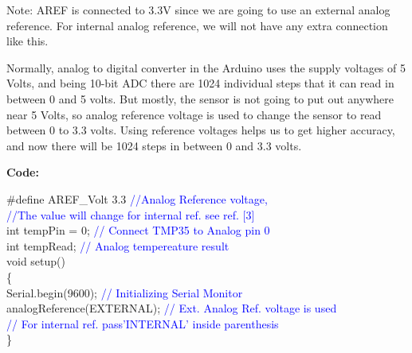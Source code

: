 \documentclass[12pt,a4paper]{article}
\begin{document}
\begin{justify}
\noindent Note: AREF is connected to 3.3V since we are going to use an external analog reference. For internal analog reference, we will not have any extra connection like this.\par
\noindent Normally, analog to digital converter in the Arduino uses the supply voltages of 5 Volts, and being  10-bit ADC there are 1024 individual steps that it can read in between 0 and 5 volts. But mostly, the sensor is not going to put out anywhere near 5 Volts, so analog reference voltage is used to change the sensor to read between 0 to 3.3 volts. Using reference voltages helps us to get higher accuracy, and now there will be 1024 steps in between 0 and 3.3 volts.
\end{justify}

\hspace{2cm}\textbf{\large Code:}\\[6pt]


\setlength{\parindent}{10eM}

\#define AREF\_Volt  3.3  \hspace{12pt}\textcolor{blue}{//Analog Reference voltage,\\ //The value will change for internal ref. see ref. [3]  }\\

int tempPin = 0; \hspace{12pt}\textcolor{blue}{// Connect TMP35 to Analog pin 0}\\
int tempRead; \hspace{12pt}\textcolor{blue}{// Analog tempereature result }\\[12pt]   

  void setup() \\
  \{\\
  Serial.begin(9600);\hspace{12pt}\textcolor{blue}{  // Initializing Serial Monitor} \\
  analogReference(EXTERNAL);\hspace{12pt}\textcolor{blue}{ // Ext. Analog Ref. voltage is used\\ // For internal ref. pass'INTERNAL' inside parenthesis}\\
\}\\[12pt]
\end{document}
